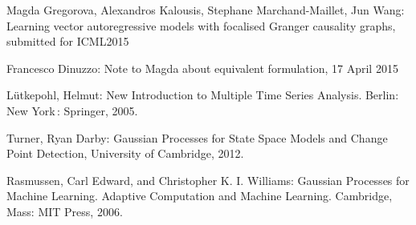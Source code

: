 \documentclass[a4paper]{article}
\begin{document}
\begin{thebibliography}{9}

  Magda Gregorova, Alexandros Kalousis, Stephane Marchand-Maillet, Jun Wang:
  Learning vector autoregressive models with focalised Granger causality graphs,
  submitted for ICML2015

  Francesco Dinuzzo: Note to Magda about equivalent formulation, 
  17 April 2015
  
	L\"utkepohl, Helmut: New Introduction to Multiple Time Series Analysis.
	Berlin: New York : Springer, 2005.
	
Turner, Ryan Darby: Gaussian Processes for State Space Models and Change Point Detection, University of Cambridge, 2012. 

Rasmussen, Carl Edward, and Christopher K. I. Williams: Gaussian Processes for Machine Learning. Adaptive Computation and Machine Learning. Cambridge, Mass: MIT Press, 2006.




\end{thebibliography}
\end{document}
